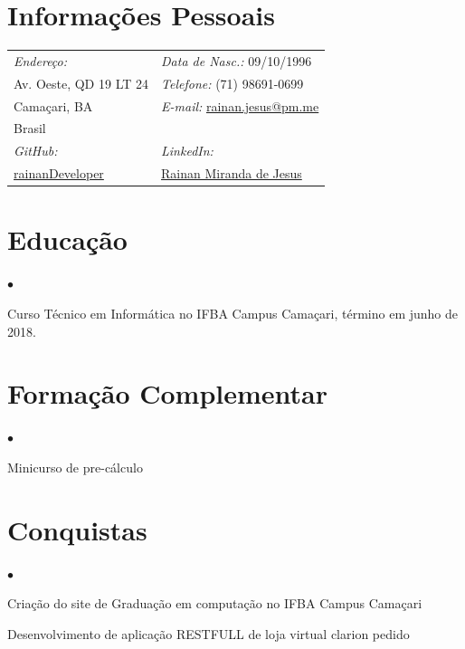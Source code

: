 \documentclass[margin,line]{res}
\newenvironment{list2}{
 \begin{list}{$\bullet$}{%
     \setlength{\itemsep}{0in}
     \setlength{\parsep}{0in} \setlength{\parskip}{0in}
     \setlength{\topsep}{0in} \setlength{\partopsep}{0in}
     \setlength{\leftmargin}{0.2in}}}{\end{list}}
\begin{document}
\begin{resume}
\section{Informações Pessoais}
\vspace{.05in}
\begin{tabular}{@{}p{2.5in}p{3.5in}}
{\it Endereço: }                   & {\it Data de Nasc.:}  09/10/1996 \\
Av. Oeste, QD 19 LT 24 & {\it Telefone:}  (71) 98691-0699 \\
Camaçari, BA            & {\it E-mail:}  \href{mailto:rainan.jesus@pm.me}{rainan.jesus@pm.me}\\
Brasil                      & {\it }\\
{\it GitHub:}  & {\it LinkedIn:} \\
\href{https://github.com/rainanDeveloper}{rainanDeveloper} & \href{https://www.linkedin.com/in/rainan-miranda-de-jesus-508a43153/}{Rainan Miranda de Jesus}
\end{tabular}
\vspace{0.2cm}
\section{Educação}
\begin{list2}

\item Curso Técnico em Informática no IFBA Campus Camaçari, término em junho de 2018.
\end{list2}
\vspace{0.2cm}
\section{Formação Complementar}
\begin{list2}
\item Minicurso de pre-cálculo
\end{list2}
\vspace{0.2cm}
\section{Conquistas}
\begin{list2}
\item Criação do site de Graduação em computação no IFBA Campus Camaçari
\item Desenvolvimento de aplicação RESTFULL de loja virtual clarion pedido
\end{list2}
\vspace{1cm}

\end{resume}
\end{document}
